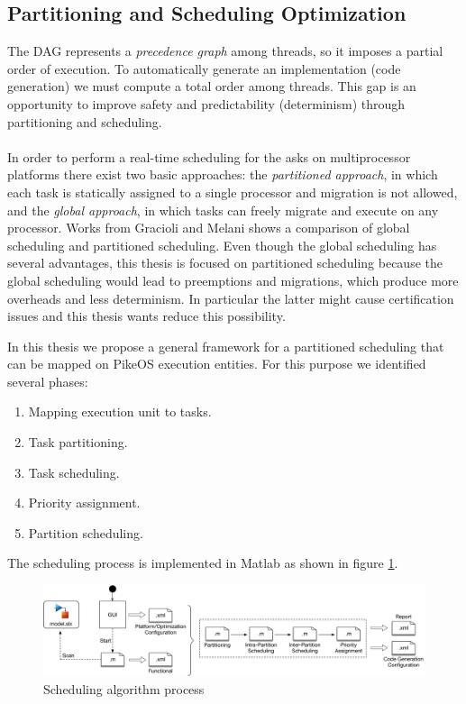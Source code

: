 \subsection{Partitioning and Scheduling Optimization}
The DAG represents a \emph{precedence graph} among threads, so it imposes a partial order of execution. To automatically generate an implementation (code generation) we must compute a total order among threads. This gap is an opportunity to improve safety and predictability (determinism) through partitioning and scheduling.

\paragraph{} In order to perform a real-time scheduling for the asks on multiprocessor platforms there exist two basic approaches: the \emph{partitioned approach}, in which each task is statically assigned to a single processor and migration is not allowed, and the \emph{global approach}, in which tasks can freely migrate and execute on any processor. Works from Gracioli\cite{Gracioli2013} and Melani\cite{Melani} shows a comparison of global scheduling and partitioned scheduling. Even though the global scheduling has several advantages, this thesis is focused on partitioned scheduling because the global scheduling would lead to preemptions and migrations, which produce more overheads and less determinism. In particular the latter might cause certification issues and this thesis wants reduce this possibility.

\par In this thesis we propose a general framework for a partitioned scheduling that can be mapped on PikeOS execution entities. For this purpose we identified several phases:
\begin{enumerate}
\item Mapping execution unit to tasks.
\item Task partitioning.
\item Task scheduling.
\item Priority assignment.
\item Partition scheduling.
\end{enumerate}
The scheduling process is implemented in Matlab as shown in figure \ref{fig:SchedulingProcess}.
\begin{figure}[htbp] 
\centering    
\includegraphics[width=1.0\textwidth]{SchedulingProcess}
\caption{Scheduling algorithm process}
\label{fig:SchedulingProcess}
\end{figure}

